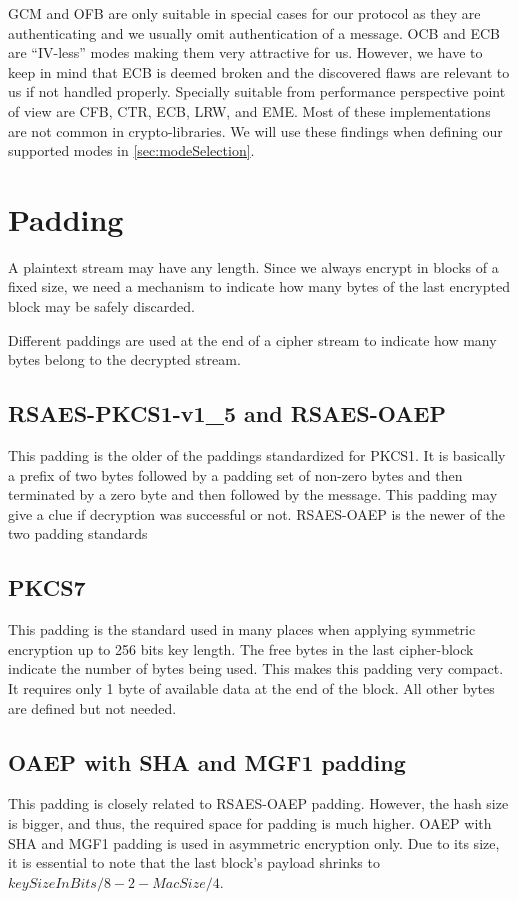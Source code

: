 GCM and OFB are only suitable in special cases for our protocol as they are authenticating and we usually omit authentication of a message.  OCB and ECB are ``IV-less'' modes making them very attractive for us. However, we have to keep in mind that ECB is deemed broken and the discovered flaws are relevant to us if not handled properly. Specially suitable from performance perspective point of view are CFB, CTR, ECB, LRW, and EME. Most of these implementations are not common in crypto-libraries. We will use these findings when defining our supported modes in \cref{sec:modeSelection}.

\section{Padding}
A plaintext stream may have any length. Since we always encrypt in blocks of a fixed size, we need a mechanism to indicate how many bytes of the last encrypted block may be safely discarded. 

Different paddings are used at the end of a cipher stream to indicate how many bytes belong to the decrypted stream.

\subsection{RSAES-PKCS1-v1\_5 and RSAES-OAEP}
This padding is the older of the paddings standardized for PKCS1. It is basically a prefix of two bytes followed by a padding set of non-zero bytes and then terminated by a zero byte and then followed by the message. This padding may give a clue if decryption was successful or not. RSAES-OAEP is the newer of the two padding standards 

\subsection{PKCS7} 
This padding is the standard used in many places when applying symmetric encryption up to 256 bits key length. The free bytes in the last cipher-block indicate the number of bytes being used. This makes this padding very compact. It requires only 1 byte of available data at the end of the block. All other bytes are defined but not needed.

\subsection{OAEP with SHA and MGF1 padding} 
This padding is closely related to RSAES-OAEP padding. However, the hash size is bigger, and thus, the required space for padding is much higher. OAEP with SHA and MGF1 padding is used in asymmetric encryption only. Due to its size, it is essential to note that the last block's payload shrinks to $keySizeInBits/8-2-MacSize/4$.

